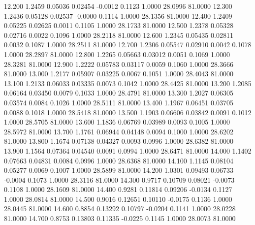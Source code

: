   12.200   1.2459   0.05036   0.02454  -0.0012   0.1123   1.0000  28.0996  81.0000
  12.300   1.2436   0.05128   0.02537  -0.0000   0.1114   1.0000  28.1356  81.0000
  12.400   1.2409   0.05225   0.02625   0.0011   0.1105   1.0000  28.1733  81.0000
  12.500   1.2378   0.05328   0.02716   0.0022   0.1096   1.0000  28.2118  81.0000
  12.600   1.2345   0.05435   0.02811   0.0032   0.1087   1.0000  28.2511  81.0000
  12.700   1.2306   0.05547   0.02910   0.0042   0.1078   1.0000  28.2897  81.0000
  12.800   1.2265   0.05663   0.03012   0.0051   0.1069   1.0000  28.3281  81.0000
  12.900   1.2222   0.05783   0.03117   0.0059   0.1060   1.0000  28.3666  81.0000
  13.000   1.2177   0.05907   0.03225   0.0067   0.1051   1.0000  28.4043  81.0000
  13.100   1.2133   0.06033   0.03335   0.0073   0.1042   1.0000  28.4425  81.0000
  13.200   1.2085   0.06164   0.03450   0.0079   0.1033   1.0000  28.4791  81.0000
  13.300   1.2027   0.06305   0.03574   0.0084   0.1026   1.0000  28.5111  81.0000
  13.400   1.1967   0.06451   0.03705   0.0088   0.1018   1.0000  28.5418  81.0000
  13.500   1.1903   0.06606   0.03842   0.0091   0.1012   1.0000  28.5705  81.0000
  13.600   1.1836   0.06769   0.03989   0.0093   0.1005   1.0000  28.5972  81.0000
  13.700   1.1761   0.06944   0.04148   0.0094   0.1000   1.0000  28.6202  81.0000
  13.800   1.1674   0.07138   0.04327   0.0093   0.0996   1.0000  28.6382  81.0000
  13.900   1.1564   0.07364   0.04540   0.0091   0.0994   1.0000  28.6471  81.0000
  14.000   1.1402   0.07663   0.04831   0.0084   0.0996   1.0000  28.6368  81.0000
  14.100   1.1145   0.08104   0.05277   0.0069   0.1007   1.0000  28.5899  81.0000
  14.200   1.0301   0.09493   0.06733  -0.0004   0.1073   1.0000  28.3116  81.0000
  14.300   0.9717   0.10709   0.08021  -0.0073   0.1108   1.0000  28.1609  81.0000
  14.400   0.9281   0.11814   0.09206  -0.0134   0.1127   1.0000  28.0814  81.0000
  14.500   0.9016   0.12651   0.10110  -0.0175   0.1136   1.0000  28.0445  81.0000
  14.600   0.8854   0.13292   0.10797  -0.0204   0.1141   1.0000  28.0228  81.0000
  14.700   0.8753   0.13803   0.11335  -0.0225   0.1145   1.0000  28.0073  81.0000
